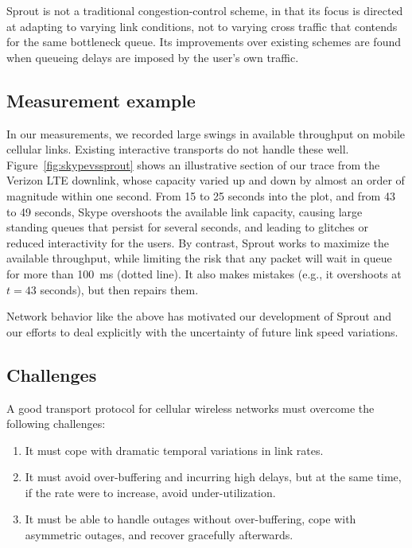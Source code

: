 Sprout is not a traditional congestion-control scheme, in that its
focus is directed at adapting to varying link conditions, not to
varying cross traffic that contends for the same bottleneck queue. Its
improvements over existing schemes are found when queueing delays are
imposed by the user's own traffic.%

\subsection{Measurement example}

In our measurements, we recorded large swings in available throughput
on mobile cellular links. Existing interactive transports do
not handle these well. Figure~\ref{fig:skypevssprout} shows an
illustrative section of our trace from the Verizon LTE downlink, whose
capacity varied up and down by almost an order of magnitude within one
second. From 15 to 25 seconds into the plot, and from 43 to 49 seconds,
Skype overshoots the available link capacity, causing large standing
queues that persist for several seconds, and leading to glitches or
reduced interactivity for the users. By contrast, Sprout works to
maximize the available throughput, while limiting the risk that any
packet will wait in queue for more than 100~ms (dotted line). It also
makes mistakes (e.g., it overshoots at $t=43$ seconds), but then
repairs them.

Network behavior like the above has motivated our development of
Sprout and our efforts to deal explicitly with the uncertainty of
future link speed variations.

\subsection{Challenges}

A good transport protocol for cellular wireless networks
must overcome the following challenges:
\begin{enumerate}
\item It must cope with dramatic temporal variations in link rates.
\item It must avoid over-buffering and incurring high delays, but at
  the same time, if the rate were to increase, avoid
  under-utilization.
\item It must be able to handle outages without over-buffering, cope
  with asymmetric outages, and recover gracefully afterwards.
\end{enumerate}

